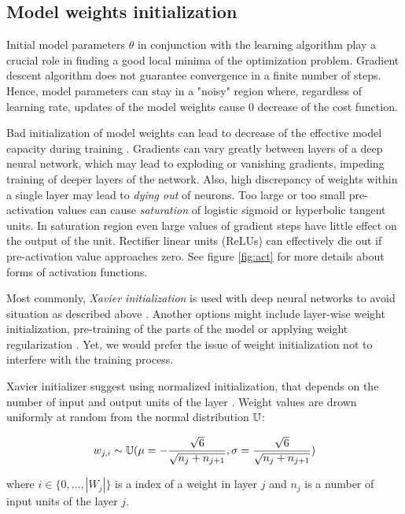 \subsection{Model weights initialization}

Initial model parameters $\theta$ in conjunction with the learning algorithm play a crucial role in finding a good local minima of the optimization problem.
Gradient descent algorithm does not guarantee convergence in a finite number of steps.
Hence, model parameters can stay in a "noisy" region where, regardless of learning rate, updates of the model weights cause 0 decrease of the cost function.

Bad initialization of model weights can lead to decrease of the effective model capacity during training \cite{Glorot2010}.
Gradients can vary greatly between layers of a deep neural network, which may lead to exploding or vanishing gradients, impeding training of deeper layers of the network.
Also, high discrepancy of weights within a single layer may lead to \textit{dying out} of neurons.
Too large or too small pre-activation values can cause \textit{saturation} of logistic sigmoid or hyperbolic tangent units. In saturation region even large values of gradient steps have little effect on the output of the unit.
Rectifier linear units (ReLUs) can effectively die out if pre-activation value approaches zero. See figure \ref{fig:act} for more details about forms of activation functions.

Most commonly, \textit{Xavier initialization} is used with deep neural networks to avoid situation as described above \cite{Glorot2010}.
Another options might include layer-wise weight initialization, pre-training of the parts of the model \cite{Simonyan2015} or applying weight regularization \cite{Good2016}.
Yet, we would prefer the issue of weight initialization not to interfere with the training process.

Xavier initializer suggest using normalized initialization, that depends on the number of input and output units of the layer \cite{Good2016}.
Weight values are drown uniformly at random from the normal distribution $\Bbb{U}$:

\begin{equation}\label{eq:xavier}
  w_{j, i} \sim \Bbb{U}(
  \mu=-\frac{\sqrt{6}}{\sqrt{n_j+n_{j+1}}},
  \sigma=\frac{\sqrt{6}}{\sqrt{n_j+n_{j+1}}})
\end{equation}

where $i\in\{0, \ldots, |W_j|\}$ is a index of a weight in layer $j$ and $n_j$ is a number of input units of the layer $j$.


